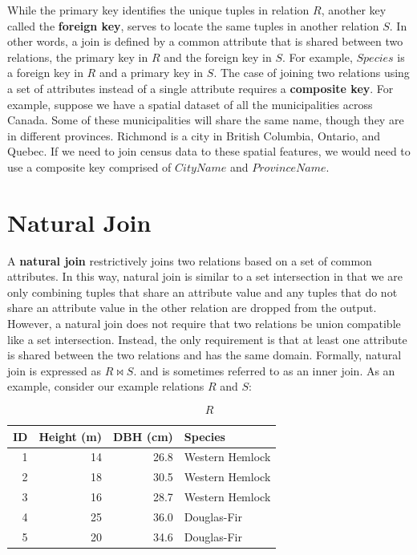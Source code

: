\documentclass[
]{book}
\begin{document}
While the primary key identifies the unique tuples in relation \(R\), another key called the \textbf{foreign key}, serves to locate the same tuples in another relation \(S\). In other words, a join is defined by a common attribute that is shared between two relations, the primary key in \(R\) and the foreign key in \(S\). For example, \(Species\) is a foreign key in \(R\) and a primary key in \(S\). The case of joining two relations using a set of attributes instead of a single attribute requires a \textbf{composite key}. For example, suppose we have a spatial dataset of all the municipalities across Canada. Some of these municipalities will share the same name, though they are in different provinces. Richmond is a city in British Columbia, Ontario, and Quebec. If we need to join census data to these spatial features, we would need to use a composite key comprised of \(CityName\) and \(ProvinceName\).

\hypertarget{natural-join}{%
\section{Natural Join}\label{natural-join}}

A \textbf{natural join} restrictively joins two relations based on a set of common attributes. In this way, natural join is similar to a set intersection in that we are only combining tuples that share an attribute value and any tuples that do not share an attribute value in the other relation are dropped from the output. However, a natural join does not require that two relations be union compatible like a set intersection. Instead, the only requirement is that at least one attribute is shared between the two relations and has the same domain. Formally, natural join is expressed as \(R⋈S\). and is sometimes referred to as an inner join. As an example, consider our example relations \(R\) and \(S\):

\[R\]

\begin{tabular}{rrrl}
\toprule
ID & Height (m) & DBH (cm) & Species\\
\midrule
1 & 14 & 26.8 & Western Hemlock\\
2 & 18 & 30.5 & Western Hemlock\\
3 & 16 & 28.7 & Western Hemlock\\
4 & 25 & 36.0 & Douglas-Fir\\
5 & 20 & 34.6 & Douglas-Fir\\
\bottomrule
\end{tabular}
\end{document}
